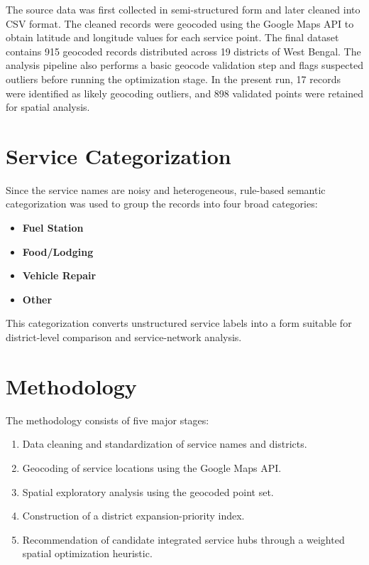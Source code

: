 The source data was first collected in semi-structured form and later cleaned into CSV format. The cleaned records were geocoded using the Google Maps API to obtain latitude and longitude values for each service point. The final dataset contains 915 geocoded records distributed across 19 districts of West Bengal. The analysis pipeline also performs a basic geocode validation step and flags suspected outliers before running the optimization stage. In the present run, 17 records were identified as likely geocoding outliers, and 898 validated points were retained for spatial analysis.

\section{Service Categorization}

Since the service names are noisy and heterogeneous, rule-based semantic categorization was used to group the records into four broad categories:
\begin{itemize}
    \item \textbf{Fuel Station}
    \item \textbf{Food/Lodging}
    \item \textbf{Vehicle Repair}
    \item \textbf{Other}
\end{itemize}

This categorization converts unstructured service labels into a form suitable for district-level comparison and service-network analysis.

\section{Methodology}

The methodology consists of five major stages:
\begin{enumerate}
    \item Data cleaning and standardization of service names and districts.
    \item Geocoding of service locations using the Google Maps API.
    \item Spatial exploratory analysis using the geocoded point set.
    \item Construction of a district expansion-priority index.
    \item Recommendation of candidate integrated service hubs through a weighted spatial optimization heuristic.
\end{enumerate}

